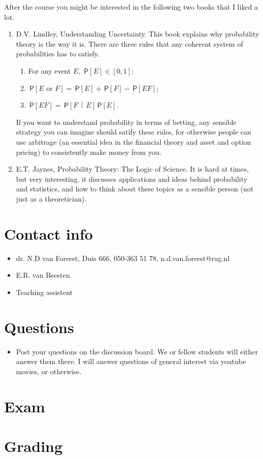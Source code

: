 \documentclass[a4paper]{article}
\theoremstyle{definition}
\newcommand{\given}{\,\middle|\,}
\renewcommand{\P}[1]{\,\mathsf{P}\left[#1\right]}
\newcommand{\1}[1]{\,I_{#1}} %
\begin{document}
After the course you might be interested in the following two books that I liked a lot. 
\begin{enumerate}
\item D.V. Lindley, Understanding Uncertainty. This book explains why probability theory is the way it is. There are three rules that any coherent system of probabilities has to satisfy. 
\begin{enumerate}
\item For any event \(E\), \(\P{E} \in [0,1]\);
\item \(\P{E \text{ or } F} = \P{E} + \P{F} - \P{EF}\);
\item \(\P{EF} = \P{F\given E} \P{E}\).
\end{enumerate}
If you want to understand probability in terms of betting, any sensible strategy you can imagine should satify   these rules, for otherwise people can use arbitrage (an essential idea in the financial theory and asset and option pricing) to consistently make  money from you.
\item E.T. Jaynes, Probability Theory: The Logic of Science. It is hard at times, but very interesting. it discusses  applications and ideas behind probability and statistics, and how to think about these topics as a sensible person (not just as a theoretician).
\end{enumerate}





\section{Contact info}
\label{sec:org4b26796}

\begin{itemize}
\item dr. N.D van Foreest, Duis 666, 050-363 51 78, n.d.van.foreest@rug.nl
\item E.R. van Beesten
\item Teaching assistent
\end{itemize}

\section{Questions}
\label{sec:org0b418d9}

\begin{itemize}
\item Post your questions on the discussion board. We or fellow students will either answer them there. I will answer questions of general interest via youtube movies, or otherwise.
\end{itemize}

\section{Exam}
\label{sec:org6d736b5}

\section{Grading}
\label{sec:orga509feb}
\end{document}
